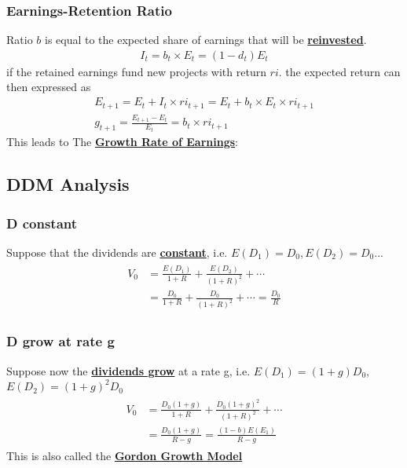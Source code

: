 \begin{multicols}{2}
\subsubsection{Earnings-Retention Ratio}
Ratio $b$ is equal to the expected share of earnings that will be \underline{\textbf{reinvested}}.
\begin{gather*}
    I_t = b_t\times E_t = (1-d_t)E_t
\end{gather*}
if the retained earnings fund new projects with return $ri$. the expected return can then expressed as
\begin{gather*}
    E_{t+1} = E_t + I_t\times ri_{t+1} = E_t+b_t\times E_t\times ri_{t+1}\\
    \boxed{g_{t+1}=\frac{E_{t+1}-E_t}{E_t} = b_t\times ri_{t+1}}
\end{gather*}
This leads to The \underline{\textbf{Growth Rate of Earnings}}:

\subsection{DDM Analysis}
\subsubsection{D constant}
Suppose that the dividends are \underline{\textbf{constant}}, i.e. $E(D_1) = D_0, E(D_2) = D_0...$
\begin{gather*}
    \begin{split}
        V_0 &= \frac{E(D_1)}{1+R} + \frac{E(D_2)}{(1+R)^2}+\cdots\\
        &= \frac{D_0}{1+R} + \frac{D_0}{(1+R)^2}+\cdots = \boxed{\frac{D_0}{R}}
    \end{split}
\end{gather*}
\subsubsection{D grow at rate g}
Suppose now the \underline{\textbf{dividends grow}} at a rate g, i.e. $E(D_1) = (1+g)D_0$, $E(D_2) = (1+g)^2D_0$
\begin{gather*}
    \begin{split}
        V_0 &= \frac{D_0(1+g)}{1+R}+\frac{D_0(1+g)^2}{(1+R)^2}+\cdots\\
        &= \frac{D_0(1+g)}{R-g} = \boxed{\frac{(1-b)E(E_1)}{R-g}}
    \end{split}
\end{gather*}
This is also called the \underline{\textbf{Gordon Growth Model}}\par 


\end{multicols}
